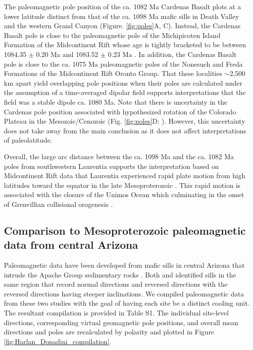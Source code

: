 The paleomagnetic pole position of the ca. 1082 Ma Cardenas Basalt plots at a lower latitude distinct from that of the ca. 1098 Ma mafic sills in Death Valley and the western Grand Canyon (Figure. \ref{fig:poles}A, C). Instead, the Cardenas Basalt pole is close to the paleomagnetic pole of the Michipicoten Island Formation of the Midcontinent Rift whose age is tightly bracketed to be between 1084.35 $\pm$ 0.20 Ma and 1083.52 $\pm$ 0.23 Ma \citep{Fairchild2017a}. In addition, the Cardenas Basalt pole is close to the ca. 1075 Ma paleomagnetic poles of the Nonesuch and Freda Formations \citep{Henry1977a, Slotznick2023a} of the Midcontinent Rift Oronto Group. That these localities $\sim$2,500 km apart yield overlapping pole positions when their poles are calculated under the assumption of a time-averaged dipolar field supports interpretations that the field was a stable dipole ca. 1080 Ma. Note that there is uncertainty in the Cardenas pole position associated with hypothesized rotation of the Colorado Plateau in the Mesozoic/Cenozoic (Fig. \ref{fig:poles}D; \cite[e.g.][]{Bryan1990a}). However, this uncertainty does not take away from the main conclusion as it does not affect interpretations of paleolatitude.

Overall, the large arc distance between the ca. 1098 Ma and the ca. 1082 Ma poles from southwestern Laurentia supports the interpretation based on Midcontinent Rift data that Laurentia experienced rapid plate motion from high latitudes toward the equator in the late Mesoproterozoic \citep{Davis1997a, Swanson-Hysell2009a}. This rapid motion is associated with the closure of the Unimos Ocean which culminating in the onset of Grenvillian collisional orogenesis \citep{Swanson-Hysell2023a}. 

\subsection*{Comparison to Mesoproterozoic paleomagnetic data from central Arizona}

Paleomagnetic data have been developed from mafic sills in central Arizona that intrude the Apache Group sedimentary rocks \citep{Helsley1972a, Harlan1993a, Donadini2011a}. Both \cite{Harlan1993a} and \cite{Donadini2011a} identified sills in the same region that record normal directions and reversed directions with the reversed directions having steeper inclinations. We compiled paleomagnetic data from these two studies with the goal of having each site be a distinct cooling unit. The resultant compilation is provided in Table S1. The individual site-level directions, corresponding virtual geomagnetic pole positions, and overall mean directions and poles are recalculated by polarity and plotted in Figure \ref{fig:Harlan_Donadini_compilation}. 

